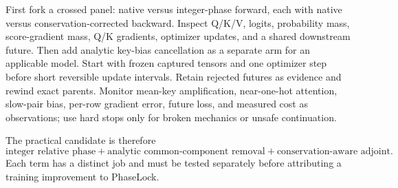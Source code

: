 \documentclass[11pt]{article}
\begin{document}
First fork a crossed panel: native versus integer-phase forward, each with native versus conservation-corrected backward. Inspect Q/K/V, logits, probability mass, score-gradient mass, Q/K gradients, optimizer updates, and a shared downstream future. Then add analytic key-bias cancellation as a separate arm for an applicable model. Start with frozen captured tensors and one optimizer step before short reversible update intervals. Retain rejected futures as evidence and rewind exact parents. Monitor mean-key amplification, near-one-hot attention, slow-pair bias, per-row gradient error, future loss, and measured cost as observations; use hard stops only for broken mechanics or unsafe continuation.

The practical candidate is therefore
\begin{equation}
 \boxed{\text{integer relative phase}+
 \text{analytic common-component removal}+
 \text{conservation-aware adjoint}.}
\end{equation}
Each term has a distinct job and must be tested separately before attributing a training improvement to PhaseLock.
\end{document}
